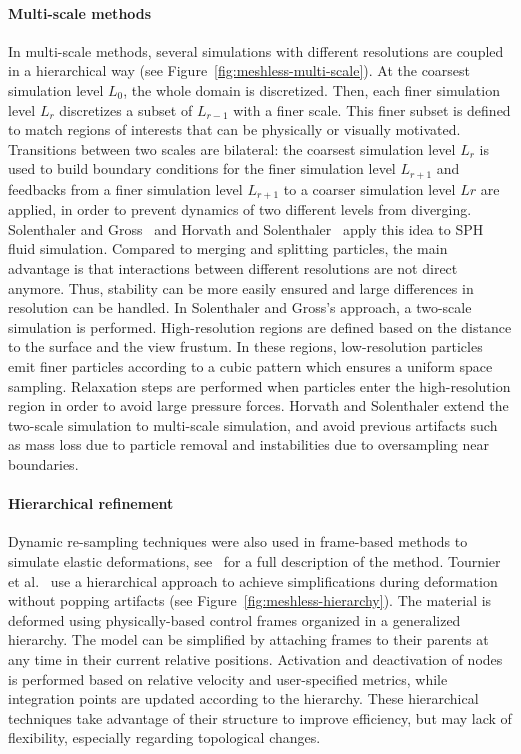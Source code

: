 \paragraph*{Multi-scale methods}
In multi-scale methods, several simulations with different resolutions are coupled in a hierarchical way (see Figure~\ref{fig:meshless-multi-scale}).
At the coarsest simulation level $L_{0}$, the whole domain is discretized. Then, each finer simulation level $L_{r}$ discretizes a subset of $L_{r-1}$ with a finer scale. This finer subset is defined to match regions of interests that can be physically or visually motivated. Transitions between two scales are bilateral: the coarsest simulation level $L_{r}$ is used to build boundary conditions for the finer simulation level $L_{r+1}$ and feedbacks from a finer simulation level $L_{r+1}$ to a coarser simulation level $L{r}$ are applied, in order to prevent dynamics of two different levels from diverging. Solenthaler and Gross~\cite{Solenthaler2011} and Horvath and Solenthaler~\cite{Horvath2013} apply this idea to SPH fluid simulation.
Compared to merging and splitting particles, the main advantage is that interactions between different resolutions are not direct anymore. Thus, stability can be more easily ensured and large differences in resolution can be handled.
In Solenthaler and Gross's approach, a two-scale simulation is performed. High-resolution regions are defined based on the distance to the surface and the view frustum. In these regions, low-resolution particles emit finer particles according to a cubic pattern which ensures a uniform space sampling. Relaxation steps are performed when particles enter the high-resolution region in order to avoid large pressure forces. Horvath and Solenthaler extend the two-scale simulation to multi-scale simulation, and avoid previous artifacts such as mass loss due to particle removal and instabilities due to oversampling near boundaries.

\paragraph*{Hierarchical refinement}
Dynamic re-sampling techniques were also used in frame-based methods to simulate elastic deformations, see~\cite{Gilles2011} for a full description of the method. Tournier et al.~\cite{Tournier2014} use a hierarchical approach to achieve simplifications during deformation without popping artifacts (see Figure~\ref{fig:meshless-hierarchy}). The material is deformed using physically-based control frames organized in a generalized hierarchy. The model can be simplified by attaching frames to their parents at any time in their current relative positions. Activation and deactivation of nodes is performed based on relative velocity and user-specified metrics, while integration points are updated according to the hierarchy. These hierarchical techniques take advantage of their structure to improve efficiency, but may lack of flexibility, especially regarding topological changes.

